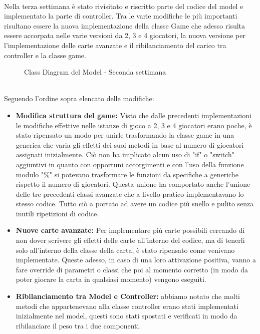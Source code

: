 \documentclass[a4paper, 12pt]{article}
\begin{document}
	\paragraph{}
	Nella terza settimana è stato rivisitato e riscritto parte del codice del model e implementato la parte di controller. Tra le varie modifiche le più importanti risultano essere la nuova implementazione della classe Game che adesso risulta essere accorpata nelle varie versioni da 2, 3 e 4 giocatori, la nuova versione per l'implementazione delle carte avanzate e il ribilanciamento del carico tra controller e la classe game. \\
	\begin{figure}[h]
		\centering
		\def\svgwidth{\columnwidth}
		\caption{Class Diagram del Model - Seconda settimana}
	\end{figure}\\
	Seguendo l'ordine sopra elencato delle modifiche:
	\begin{itemize}
		\setlength{\parskip}{0pt}
		\setlength{\parsep}{0pt}
		
		\item \textbf{Modifica struttura del game:} Visto che dalle precedenti implementazioni le modifiche effettive nelle istanze di gioco a 2, 3 e 4 giocatori erano poche, è stato ripensato un modo per unirle trasformando la classe game in una generica che varia gli effetti dei suoi metodi in base al numero di giocatori assignati inizialmente. Ciò non ha implicato alcun uso di "if" o "switch" aggiuntivi in quanto con opportuni accorgimenti e con l'uso della funzione modulo "\%" si potevano trasformare le funzioni da specifiche a generiche rispetto il numero di giocatori. 
		Questa unione ha comportato anche l'unione delle tre precedenti classi avanzate che a livello pratico implementavano lo stesso codice.
		Tutto ciò a portato ad avere un codice più snello e pulito senza inutili ripetizioni di codice.
		\item \textbf{Nuove carte avanzate:} Per implementare più carte possibili cercando di non dover scrivere gli effetti delle carte all'interno del codice, ma di tenerli solo all'interno della classe della carta, è stato ripensato come venivano implementate. Queste adesso, in caso di una loro attivazione positiva, vanno a fare override di parametri o classi che poi al momento corretto (in modo da poter giocare la carta in qualsiasi momento) vengono eseguiti. 
		\item \textbf{Ribilanciamento tra Model e Controller:} abbiamo notato che molti metodi che appartenevano alla classe controller erano stati implementati inizialmente nel model, questi sono stati spostati e verificati in modo da ribilanciare il peso tra i due componenti.
	\end{itemize}
	\newpage
\end{document}
